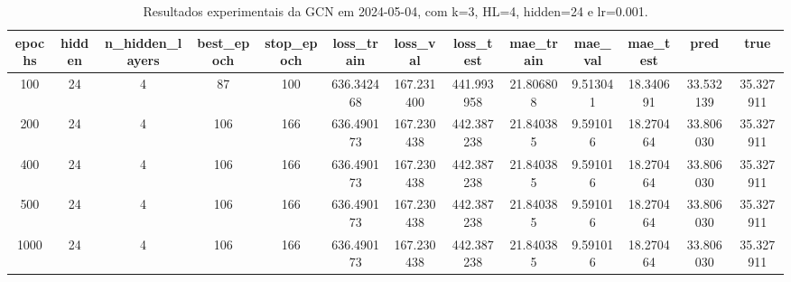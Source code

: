 \begin{table}[h]
\centering
\caption{Resultados experimentais da GCN em 2024-05-04, com k=3, HL=4, hidden=24 e lr=0.001.}
\label{tab:gcn_results_k3_hl4_h24_d20240504}
\begin{tabular}{ccccccccccccc}
\toprule
epochs & hidden & n\_hidden\_layers & best\_epoch & stop\_epoch & loss\_train & loss\_val & loss\_test & mae\_train & mae\_val & mae\_test & pred & true \\
\midrule
100 & 24 & 4 & 87 & 100 & 636.342468 & 167.231400 & 441.993958 & 21.806808 & 9.513041 & 18.340691 & 33.532139 & 35.327911 \\
200 & 24 & 4 & 106 & 166 & 636.490173 & 167.230438 & 442.387238 & 21.840385 & 9.591016 & 18.270464 & 33.806030 & 35.327911 \\
400 & 24 & 4 & 106 & 166 & 636.490173 & 167.230438 & 442.387238 & 21.840385 & 9.591016 & 18.270464 & 33.806030 & 35.327911 \\
500 & 24 & 4 & 106 & 166 & 636.490173 & 167.230438 & 442.387238 & 21.840385 & 9.591016 & 18.270464 & 33.806030 & 35.327911 \\
1000 & 24 & 4 & 106 & 166 & 636.490173 & 167.230438 & 442.387238 & 21.840385 & 9.591016 & 18.270464 & 33.806030 & 35.327911 \\
\bottomrule
\end{tabular}
\end{table}
